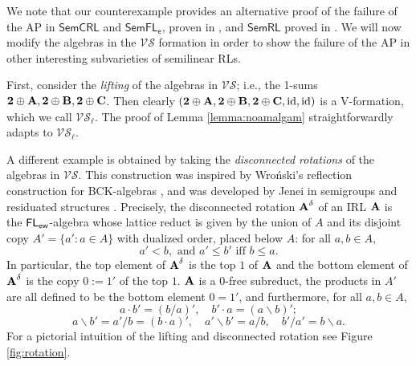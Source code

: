 \documentclass{amsart}
\theoremstyle{definition}
\numberwithin{equation}{section}
\newcommand{\alg}[1]{{\textbf{\upshape #1}}}  %
\newcommand{\back}{\backslash}
\newcommand{\VS}{\mathcal{VS}}
\begin{document}
We note that our counterexample provides an alternative proof of the failure of the AP in $\mathsf{SemCRL}$ and $\mathsf{SemFL_e}$, proven in \cite{FussnerSantschi24}, and $\mathsf{SemRL}$ proved in \cite{GilferezLeddaTsinakis2015}.
We will now modify the algebras in the $\VS$ formation in order to show the failure of the AP in other interesting subvarieties of semilinear RLs.

First, consider the {\em lifting} of the algebras in $\VS$; i.e., the 1-sums $\alg 2 \oplus \alg A, \alg 2 \oplus \alg B, \alg 2 \oplus \alg C$. Then clearly $(\alg 2 \oplus \alg A, \alg 2 \oplus \alg B, \alg 2 \oplus \alg C,{\rm id}, {\rm id})$ is a V-formation, which we call $\VS_\ell$. The proof of Lemma \ref{lemma:noamalgam} straightforwardly adapts to $\VS_\ell$. 

A different example is obtained by taking the {\em disconnected rotations} of the algebras in $\VS$. This construction was inspired by Wro\'nski's reflection construction for BCK-algebras \cite{W83}, and was developed by Jenei in semigroups and residuated structures \cite{Je00,Je03}. 
Precisely, the disconnected rotation $\alg A^\delta$ of an IRL $\alg A$ is the $\sf{FL}_{ew}$-algebra whose lattice reduct is given by the union of $A$ and its disjoint copy $A' = \{a' : a \in A\}$ with dualized order, placed below $A$: for all $a, b \in A$,  $$ a' < b, \mbox{ and } a' \leq b' \mbox{ iff } b \leq a.$$
In particular, the top element of $\alg A^\delta$ is the top $1$ of $\alg A$ and the  bottom element of $\alg A^\delta$ is the copy $0 := 1'$ of the top $1$. 
$\alg A$ is a $0$-free subreduct, the products in $A'$ are all defined to be the bottom element $0=1'$, and furthermore, for all $a,b \in A$, $$a\cdot b' = (b/a)', \quad b'\cdot a = (a \back b)';$$ 
$$a \back b' = a' /b = (b\cdot a)', \quad a' \back b' = a/b, \quad b'/a' = b \back a.$$
For a pictorial intuition of the lifting and disconnected rotation see Figure \ref{fig:rotation}. 
\end{document}
